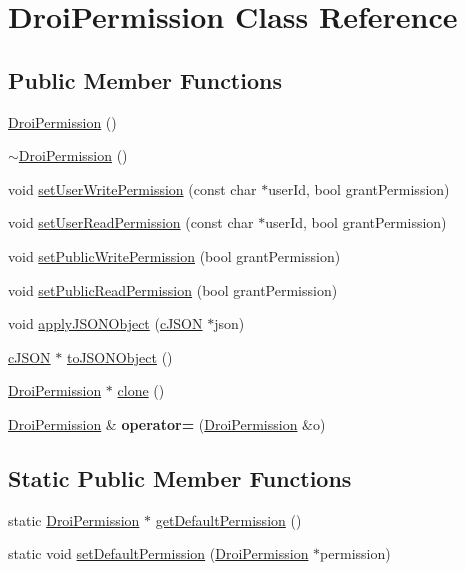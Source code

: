 \hypertarget{class_droi_permission}{}\section{Droi\+Permission Class Reference}
\label{class_droi_permission}
\subsection*{Public Member Functions}
\begin{DoxyCompactItemize}
\item 
\hyperlink{class_droi_permission_ad80e955e6343a75f2044e8c9077a99e0}{Droi\+Permission} ()
\item 
\hyperlink{class_droi_permission_abe688f88339b09bd55b114ab3aab552a}{$\sim$\+Droi\+Permission} ()
\item 
void \hyperlink{class_droi_permission_a8843fc5d39dcb65a883f92437f433d8e}{set\+User\+Write\+Permission} (const char $\ast$user\+Id, bool grant\+Permission)
\item 
void \hyperlink{class_droi_permission_ac4544f1c4a9ce40e2c59be14e46ab7cf}{set\+User\+Read\+Permission} (const char $\ast$user\+Id, bool grant\+Permission)
\item 
void \hyperlink{class_droi_permission_abc786ec4b686910c88ef997f1274b450}{set\+Public\+Write\+Permission} (bool grant\+Permission)
\item 
void \hyperlink{class_droi_permission_aa0e05d977d1c3778f26ec65133a3591e}{set\+Public\+Read\+Permission} (bool grant\+Permission)
\item 
void \hyperlink{class_droi_permission_a5f8732404c7f3b227179cbcf8467b2c2}{apply\+J\+S\+O\+N\+Object} (\hyperlink{structc_j_s_o_n}{c\+J\+S\+ON} $\ast$json)
\item 
\hyperlink{structc_j_s_o_n}{c\+J\+S\+ON} $\ast$ \hyperlink{class_droi_permission_a3db387c0552fe5d24353027a3868159f}{to\+J\+S\+O\+N\+Object} ()
\item 
\hyperlink{class_droi_permission}{Droi\+Permission} $\ast$ \hyperlink{class_droi_permission_afff19c97fc9047613a7f44425b9d6041}{clone} ()
\item 
\mbox{\label{class_droi_permission_a0dd22b01fcdf4b0fa3c488d4b504c29b}} 
\hyperlink{class_droi_permission}{Droi\+Permission} \& {\bfseries operator=} (\hyperlink{class_droi_permission}{Droi\+Permission} \&o)
\end{DoxyCompactItemize}
\subsection*{Static Public Member Functions}
\begin{DoxyCompactItemize}
\item 
static \hyperlink{class_droi_permission}{Droi\+Permission} $\ast$ \hyperlink{class_droi_permission_a9294ad873ad22e9acf740ffcccb0c674}{get\+Default\+Permission} ()
\item 
static void \hyperlink{class_droi_permission_aca711a9a8271b21150e97e75bddd9dbe}{set\+Default\+Permission} (\hyperlink{class_droi_permission}{Droi\+Permission} $\ast$permission)
\end{DoxyCompactItemize}


